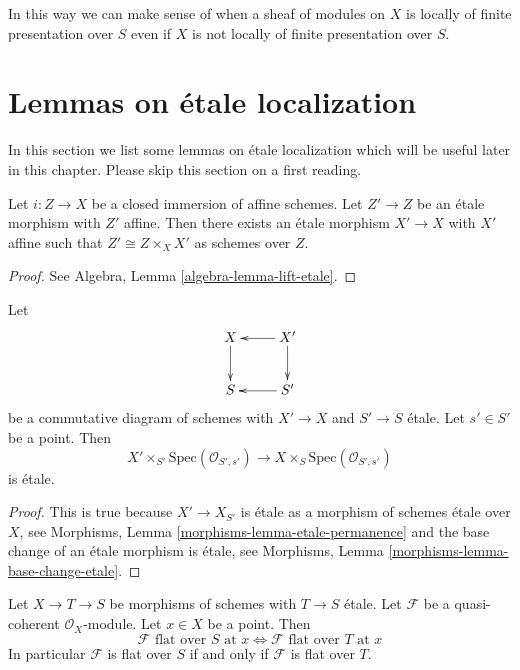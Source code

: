 \noindent
In this way we can make sense of when a sheaf of modules on $X$ is
locally of finite presentation over $S$ even if $X$ is not locally
of finite presentation over $S$.


\section{Lemmas on \'etale localization}
\label{section-etale-localization}

\noindent
In this section we list some lemmas on \'etale localization which will be
useful later in this chapter. Please skip this section on a first reading.

\begin{lemma}
\label{lemma-lift-etale}
Let $i : Z \to X$ be a closed immersion of affine schemes.
Let $Z' \to Z$ be an \'etale morphism with $Z'$ affine.
Then there exists an \'etale morphism $X' \to X$ with $X'$
affine such that $Z' \cong Z \times_X X'$ as schemes over $Z$.
\end{lemma}

\begin{proof}
See
Algebra, Lemma \ref{algebra-lemma-lift-etale}.
\end{proof}

\begin{lemma}
\label{lemma-etale-at-point}
Let
$$
\xymatrix{
X \ar[d] & X' \ar[l] \ar[d] \\
S & S' \ar[l]
}
$$
be a commutative diagram of schemes with $X' \to X$ and $S' \to S$ \'etale.
Let $s' \in S'$ be a point. Then
$$
X' \times_{S'} \text{Spec}(\mathcal{O}_{S', s'})
\longrightarrow
X \times_S \text{Spec}(\mathcal{O}_{S', s'})
$$
is \'etale.
\end{lemma}

\begin{proof}
This is true because $X' \to X_{S'}$ is \'etale as a morphism of
schemes \'etale over $X$, see
Morphisms, Lemma \ref{morphisms-lemma-etale-permanence}
and the base change of an \'etale morphism is \'etale, see
Morphisms, Lemma \ref{morphisms-lemma-base-change-etale}.
\end{proof}

\begin{lemma}
\label{lemma-etale-flat-up-down}
Let $X \to T \to S$ be morphisms of schemes with $T \to S$ \'etale.
Let $\mathcal{F}$ be a quasi-coherent $\mathcal{O}_X$-module.
Let $x \in X$ be a point. Then
$$
\mathcal{F}\text{ flat over }S\text{ at }x
\Leftrightarrow
\mathcal{F}\text{ flat over }T\text{ at }x
$$
In particular $\mathcal{F}$ is flat over $S$ if and only if $\mathcal{F}$
is flat over $T$.
\end{lemma}

